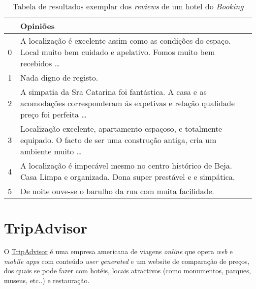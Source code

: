 \begin{table}[!ht]
  \centering
  \begin{adjustbox}{width=\columnwidth,center}
    \begin{tabular}{|l|l|}
      \hline
      ~     & Opiniões                                                                                                                                     \\ \hline
      0     & A localização é excelente assim como as condições do espaço. Local muito bem cuidado e apelativo. Fomos muito bem recebidos \dots            \\ \hline
      1     & Nada digno de registo.                                                                                                                       \\ \hline
      2     & A simpatia da Sra Catarina foi fantástica. A casa e as acomodações corresponderam ás expetivas e relação qualidade preço foi perfeita \ldots \\ \hline
      3     & Localização excelente, apartamento espaçoso, e totalmente equipado.
      O facto de ser uma construção antiga, cria um ambiente muito \ldots                                                                                  \\ \hline
      4     & A localização é impecável mesmo no centro histórico de Beja. Casa Limpa e organizada. Dona super prestável e e simpática.                    \\ \hline
      5     & De noite ouve-se o barulho da rua com muita facilidade.                                                                                      \\ \hline
    \end{tabular}
  \end{adjustbox}
  \caption{Tabela de resultados exemplar dos \textit{reviews} de um hotel do \textit{Booking}}
  \label{table:3}
\end{table}

\section{TripAdvisor}

O \href{https://www.tripadvisor.pt/}{TripAdvisor} é uma empresa americana de viagens \textit{online} que opera \textit{web} e \textit{mobile apps} com conteúdo \textit{user generated} e um website de comparação de preços, dos quais se pode fazer com hotéis, locais atractivos (como monumentos, parques, museus, etc..) e restauração.

